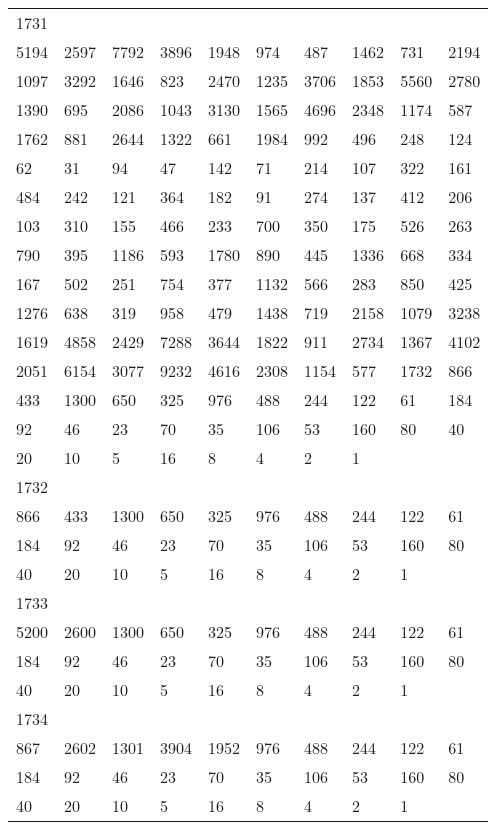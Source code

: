 \begin{longtable}{*{10}{l}}
1731&&&&&&&&&\\
5194& 2597& 7792& 3896& 1948& 974& 487& 1462& 731& 2194\\
1097& 3292& 1646& 823& 2470& 1235& 3706& 1853& 5560& 2780\\
1390& 695& 2086& 1043& 3130& 1565& 4696& 2348& 1174& 587\\
1762& 881& 2644& 1322& 661& 1984& 992& 496& 248& 124\\
62& 31& 94& 47& 142& 71& 214& 107& 322& 161\\
484& 242& 121& 364& 182& 91& 274& 137& 412& 206\\
103& 310& 155& 466& 233& 700& 350& 175& 526& 263\\
790& 395& 1186& 593& 1780& 890& 445& 1336& 668& 334\\
167& 502& 251& 754& 377& 1132& 566& 283& 850& 425\\
1276& 638& 319& 958& 479& 1438& 719& 2158& 1079& 3238\\
1619& 4858& 2429& 7288& 3644& 1822& 911& 2734& 1367& 4102\\
2051& 6154& 3077& 9232& 4616& 2308& 1154& 577& 1732& 866\\
433& 1300& 650& 325& 976& 488& 244& 122& 61& 184\\
92& 46& 23& 70& 35& 106& 53& 160& 80& 40\\
20& 10& 5& 16& 8& 4& 2& 1& \\

1732&&&&&&&&&\\
866& 433& 1300& 650& 325& 976& 488& 244& 122& 61\\
184& 92& 46& 23& 70& 35& 106& 53& 160& 80\\
40& 20& 10& 5& 16& 8& 4& 2& 1& \\

1733&&&&&&&&&\\
5200& 2600& 1300& 650& 325& 976& 488& 244& 122& 61\\
184& 92& 46& 23& 70& 35& 106& 53& 160& 80\\
40& 20& 10& 5& 16& 8& 4& 2& 1& \\

1734&&&&&&&&&\\
867& 2602& 1301& 3904& 1952& 976& 488& 244& 122& 61\\
184& 92& 46& 23& 70& 35& 106& 53& 160& 80\\
40& 20& 10& 5& 16& 8& 4& 2& 1& \\


\end{longtable}
